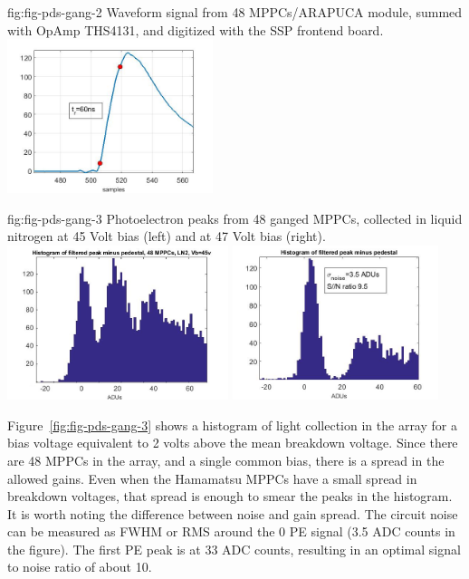 \begin{dunefigure}
 {fig:fig-pds-gang-2}
 {Waveform signal from 48 MPPCs/ARAPUCA module, summed with OpAmp THS4131, and digitized with the SSP frontend board.}
\includegraphics[height=4.5cm]{graphics/pds-gang-rise_time.jpg}
\end{dunefigure}

\begin{dunefigure}
 {fig:fig-pds-gang-3}
 {Photoelectron peaks from 48 ganged MPPCs, collected in liquid nitrogen at 45 Volt bias (left) and at 47 Volt bias (right).}
\includegraphics[height=4.5cm]{graphics/pds-gang48-45v.jpg}
\includegraphics[height=4.5cm]{graphics/pds-gang48-47v.jpg}
\end{dunefigure}

Figure~\ref{fig:fig-pds-gang-3} shows a histogram of light collection in the array for a bias voltage equivalent to 2 volts above the mean breakdown voltage. Since there are 48 MPPCs in the array, and a single common bias, there is a spread in the allowed gains. Even when the Hamamatsu MPPCs have a small spread in breakdown voltages, that spread is enough to smear the peaks in the histogram. It is worth noting the difference between noise and gain spread. The circuit noise can be measured as FWHM or RMS around the 0 PE signal (3.5 ADC counts in the figure). The first PE peak is at 33 ADC counts, resulting in an optimal signal to noise ratio of about 10.

